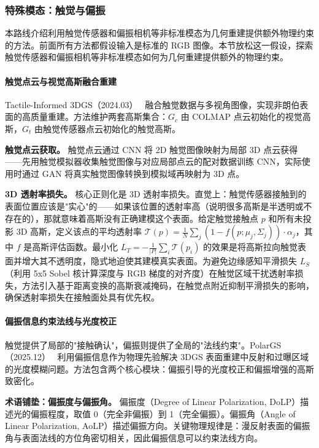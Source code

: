 \subsubsection{特殊模态：触觉与偏振}

本路线介绍利用触觉传感器和偏振相机等非标准模态为几何重建提供额外物理约束的方法。前面所有方法都假设输入是标准的 RGB 图像。本节放松这一假设，探索触觉传感器和偏振相机等非标准模态如何为几何重建提供额外的物理约束。

\paragraph{触觉点云与视觉高斯融合重建}

Tactile-Informed 3DGS（2024.03）~\cite{2403_20275} 融合触觉数据与多视角图像，实现非朗伯表面的高质量重建。方法维护两套高斯集合：$G_c$ 由 COLMAP 点云初始化的视觉高斯，$G_t$ 由触觉传感器点云初始化的触觉高斯。

\textbf{触觉点云获取。} 触觉点云通过 CNN 将 2D 触觉图像映射为局部 3D 点云获得——先用触觉模拟器收集触觉图像与对应局部点云的配对数据训练 CNN，实际使用时通过 GAN 将真实触觉图像转换到模拟域再映射为 3D 点。

\textbf{3D 透射率损失。} 核心正则化是 3D 透射率损失。直觉上：触觉传感器接触到的表面位置应该是"实心"的——如果该位置的透射率高（说明很多高斯是半透明或不存在的），那就意味着高斯没有正确建模这个表面。给定触觉接触点 $p$ 和所有未投影 3D 高斯，定义该点的平均透射率 $\mathcal{T}(p) = \frac{1}{N}\sum_{j}(1 - f(p; \mu_j, \Sigma_j))\cdot\alpha_j$，其中 $f$ 是高斯评估函数。最小化 $L_T = -\frac{1}{|P|}\sum_i \mathcal{T}(p_i)$ 的效果是将高斯拉向触觉表面并增大其不透明度，隐式地迫使其建模真实表面。为避免边缘感知平滑损失 $L_S$（利用 5x5 Sobel 核计算深度与 RGB 梯度的对齐度）在触觉区域干扰透射率损失，方法引入基于距离变换的高斯衰减掩码，在触觉点附近抑制平滑损失的影响，确保透射率损失在接触面处具有优先权。

\paragraph{偏振信息约束法线与光度校正}

触觉提供了局部的"接触确认"，偏振则提供了全局的"法线约束"。PolarGS（2025.12）~\cite{2512_00794} 利用偏振信息作为物理先验解决 3DGS 表面重建中反射和过曝区域的光度模糊问题。方法包含两个核心模块：偏振引导的光度校正和偏振增强的高斯致密化。

\textbf{术语铺垫：偏振度与偏振角。} 偏振度（Degree of Linear Polarization, DoLP）描述光的偏振程度，取值 0（完全非偏振）到 1（完全偏振）。偏振角（Angle of Linear Polarization, AoLP）描述偏振方向。关键物理规律是：漫反射表面的偏振角与表面法线的方位角密切相关，因此偏振信息可以约束法线方向。

